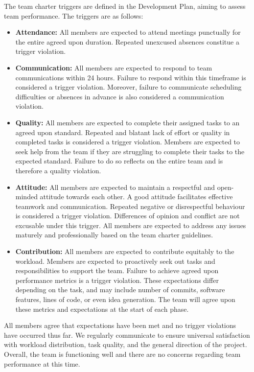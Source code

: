 \documentclass{article}
\begin{document}
The team charter triggers are defined in the Development Plan, aiming to assess team performance. The triggers are as follows:
\begin{itemize}
    \item \textbf{Attendance:} All members are expected to attend meetings punctually for the entire agreed upon duration. Repeated unexcused absences constitue a trigger violation.
    \item \textbf{Communication:} All members are expected to respond to team communications within 24 hours. Failure to respond within this timeframe is considered a trigger violation. Moreover, failure to communicate scheduling difficulties or absences in advance is also considered a communication violation.
    \item \textbf{Quality:} All members are expected to complete their assigned tasks to an agreed upon standard. Repeated and blatant lack of effort or quality in completed tasks is considered a trigger violation. Members are expected to seek help from the team if they are struggling to complete their tasks to the expected standard. Failure to do so reflects on the entire team and is therefore a quality violation.
    \item \textbf{Attitude:} All members are expected to maintain a respectful and open-minded attitude towards each other. A good attitude facilitates effective teamwork and communication. Repeated negative or disrespectful behaviour is considered a trigger violation. Differences of opinion and conflict are not excusable under this trigger. All members are expected to address any issues maturely and professionally based on the team charter guidelines.
    \item \textbf{Contribution:} All members are expected to contribute equitably to the workload. Members are expected to proactively seek out tasks and responsibilities to support the team. Failure to achieve agreed upon performance metrics is a trigger violation. These expectations differ depending on the task, and may include number of commits, software features, lines of code, or even idea generation. The team will agree upon these metrics and expectations at the start of each phase.
\end{itemize}
All members agree that expectations have been met and no trigger violations have occurred thus far. We regularly communicate to ensure universal satisfaction with workload distribution, task quality, and the general direction of the project. Overall, the team is functioning well and there are no concerns regarding team performance at this time.
\end{document}

